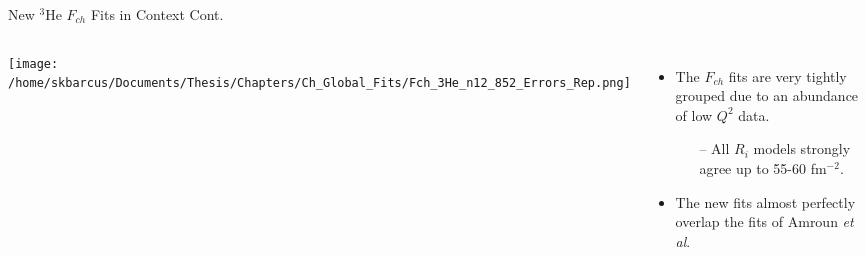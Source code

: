 \documentclass[10pt]{beamer}
\begin{document}
\begin{frame}[fragile]{New $^3$He $F_{ch}$ Fits in Context Cont.}

	\begin{columns}[T,onlytextwidth]  
	
	\begin{center}
	\texttt{[image: /home/skbarcus/Documents/Thesis/Chapters/Ch\_Global\_Fits/Fch\_3He\_n12\_852\_Errors\_Rep.png]}
	\end{center}
	
	
	\begin{itemize}
		\item The $F_{ch}$ fits are \alert{very tightly grouped} due to an abundance of low $Q^2$ data.
		\begin{itemize}
			\item[--] All $R_i$ models strongly \alert{agree up to 55-60 fm$^{-2}$}.
		\end{itemize}
		\item The new fits almost perfectly overlap the fits of Amroun \textit{et al}.
	\end{itemize}
	
	\end{columns}
	

\end{frame}
\end{document}
